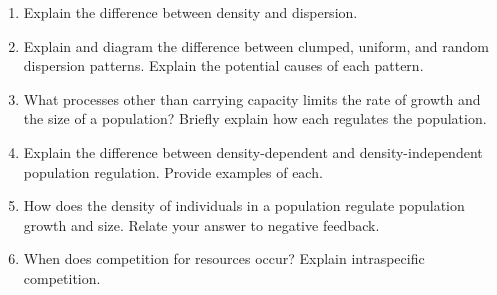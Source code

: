 \documentclass[letterpaper]{tufte-handout}
\begin{document}
\begin{enumerate}

	\item Explain the difference between density and dispersion.
	
	\item Explain and diagram the difference between clumped, uniform, and random dispersion patterns. Explain the potential causes of each pattern.
	
	\item What processes other than carrying capacity limits the rate of growth and the size of a population?  Briefly explain how each regulates the population.

	\item Explain the difference between density-dependent and density-independent population regulation.  Provide examples of each.  

	\item How does the density of individuals in a population regulate population growth and size.  Relate your answer to negative feedback.

	\item When does competition for resources occur?  Explain intraspecific competition.  

\end{enumerate}
\end{document}
